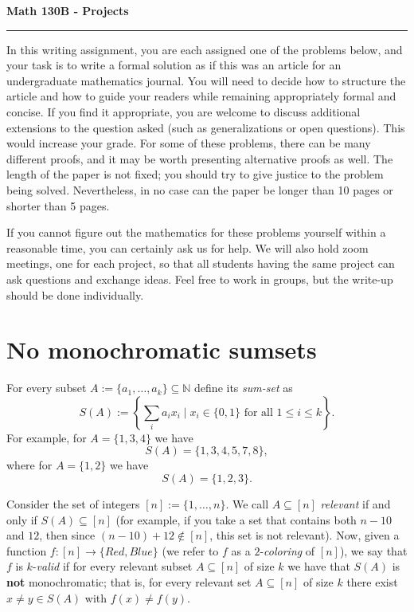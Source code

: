 \documentclass[11pt,letterpaper]{article}
\begin{document}
\begin{center}
{\bf \Large Math 130B - Projects}
\vspace{0.2cm}
\hrule
\end{center}

In this writing assignment, you are each assigned one of the problems below, and your task is to write a formal solution as if this was an article for an undergraduate mathematics journal. You will need to decide how to structure
the article and how to guide your readers while remaining
appropriately formal and concise.  If you find it appropriate, you are welcome to discuss additional extensions to the question asked (such as generalizations or open questions). This would increase your grade. For some of these problems, there can be many different proofs, and it may be worth presenting alternative proofs as well.  The length of the paper is not fixed; you should try to give justice to the problem being solved. Nevertheless, in no case can the paper be longer than 10 pages or shorter than 5 pages.

If you cannot figure out the mathematics for these problems yourself
within a reasonable time, you can certainly ask us for help. We will also hold zoom meetings, one for each project, so that all students having the same project can ask questions and exchange ideas. Feel free to work in groups, but the write-up should be done individually.  


\section{No monochromatic sumsets} 

For every subset $A:=\{a_1,\ldots,a_k\}\subseteq \mathbb{N}$ define its \emph{sum-set} as
$$S(A):= \left\{ \sum_{i}a_ix_i \mid x_i\in \{0,1\} \text{ for all } 1\leq i\leq k\right\}.$$
For example, for $A=\{1,3,4\}$ we have
$$S(A)=\{1,3,4,5,7,8\},$$ where for $A=\{1,2\}$ we have
$$S(A)=\{1,2,3\}.$$

Consider the set of integers $[n]:=\{1,\ldots,n\}$. We call $A\subseteq [n]$ \emph{relevant} if and only if $S(A)\subseteq [n]$ (for example, if you take a set that contains both $n-10$ and $12$, then since $(n-10)+12\notin [n]$, this set is not relevant). Now, given a function $f:[n]\rightarrow \{Red,Blue\}$ (we refer to $f$ as a $2$-\emph{coloring} of $[n]$), we say that $f$ is $k$-\emph{valid} if for every relevant subset $A\subseteq [n]$ of size $k$ we have that $S(A)$ is {\bf not} monochromatic; that is, for every relevant set $A\subseteq [n]$ of size $k$ there exist $x\neq y \in S(A)$ with $f(x)\neq f(y)$.
\end{document}
